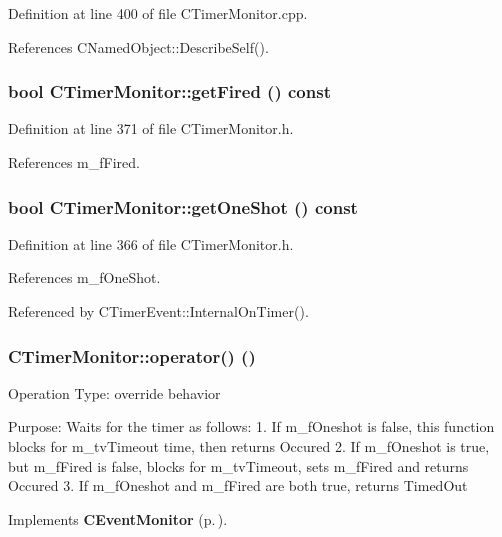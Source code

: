 Definition at line 400 of file CTimer\-Monitor.cpp.

References CNamed\-Object::Describe\-Self().
\subsubsection{\setlength{\rightskip}{0pt plus 5cm}bool CTimer\-Monitor::get\-Fired () const\hspace{0.3cm}{\tt  [inline]}}\label{classCTimerMonitor_a6}




Definition at line 371 of file CTimer\-Monitor.h.

References m\_\-f\-Fired.
\subsubsection{\setlength{\rightskip}{0pt plus 5cm}bool CTimer\-Monitor::get\-One\-Shot () const\hspace{0.3cm}{\tt  [inline]}}\label{classCTimerMonitor_a5}




Definition at line 366 of file CTimer\-Monitor.h.

References m\_\-f\-One\-Shot.

Referenced by CTimer\-Event::Internal\-On\-Timer().
\subsubsection{ CTimer\-Monitor::operator() ()\hspace{0.3cm}{\tt  [virtual]}}\label{classCTimerMonitor_a7}


Operation Type: override behavior

Purpose: Waits for the timer as follows: 1. If m\_\-f\-Oneshot is false, this function blocks for m\_\-tv\-Timeout time, then returns Occured 2. If m\_\-f\-Oneshot is true, but m\_\-f\-Fired is false, blocks for m\_\-tv\-Timeout, sets m\_\-f\-Fired and returns Occured 3. If m\_\-f\-Oneshot and m\_\-f\-Fired are both true, returns Timed\-Out 

Implements {\bf CEvent\-Monitor} {\rm (p.\,\pageref{classCEventMonitor_a7})}.

